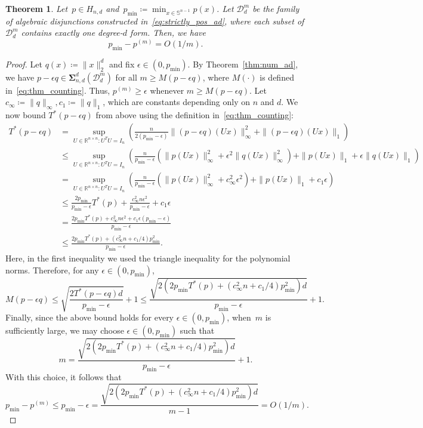 \documentclass[12pt]{article}
\newcommand{\reals}{\mathbb{R}}
\newcommand{\DiSOS}{\mathbf{\Sigma}}
\newcommand{\defeq}{\coloneq}
\newcommand{\mbS}{\mathbb{S}}
\newcommand{\mcD}{\mathcal{D}}
\newtheorem{theorem}{Theorem}%
\theoremstyle{remark}
\begin{document}
\begin{theorem}\label{thm:poly_min_disos_lb}
Let~$p\in H_{n,d}$ and~$p_{\min}\defeq\min_{x\in\mbS^{n-1}} p(x)$. Let $\mcD^m_d$ be the family of algebraic disjunctions constructed in~\eqref{eq:strictly_pos_ad}, where each subset of $\mcD_d^m$ contains exactly one degree-$d$ form. 
Then, we have
\[p_{\min}-p^{(m)}= O(1/m).\] 
\end{theorem}
\begin{proof}
Let $q(x)\defeq\|x\|_2^d$ and fix $\epsilon\in(0,p_{\min})$. By Theorem~\ref{thm:num_ad}, we have $p-\epsilon q\in\DiSOS_{n,d}^d(\mcD_d^m)$ for all $m\ge M(p-\epsilon q)$, where $M(\cdot)$ is defined in~\eqref{eq:thm_counting}. Thus, $ p^{(m)}\ge \epsilon$ 
whenever $m\ge M(p-\epsilon q)$. Let $c_{\infty}\defeq \|q\|_{\infty},c_1\defeq\|q\|_1$, which are constants depending only on $n$ and $d$. We now bound $T^*(p - \epsilon q)$ from above using the definition in~\eqref{eq:thm_counting}:
\[\begin{aligned}
T^*(p-\epsilon q)&= \sup_{U\in\reals^{n\times n}:U^TU=I_n}\left( \frac{n}{2(p_{\min}-\epsilon)}\|(p-\epsilon q)(Ux)\|_{\infty}^2 + \|(p-\epsilon q)(Ux)\|_1\right) \\
&\le \sup_{U\in\reals^{n\times n}:U^TU=I_n}\left( \frac{n}{p_{\min}-\epsilon}\left(\|p(Ux)\|_{\infty}^2+\epsilon^2\|q(Ux)\|_{\infty}^2\right) + \|p(Ux)\|_1+\epsilon \|q(Ux)\|_1\right)\\
&= \sup_{U\in\reals^{n\times n}:U^TU=I_n}\left( \frac{n}{p_{\min}-\epsilon}\left(\|p(Ux)\|_{\infty}^2+c_{\infty}^2\epsilon^2\right) + \|p(Ux)\|_1+c_1\epsilon\right)\\
&\le \frac{2p_{\min}}{p_{\min}-\epsilon} T^*(p)+\frac{c_{\infty}^2n\epsilon^2}{p_{\min}-\epsilon}+c_1\epsilon\\
&= \frac{2p_{\min}T^*(p)+c_{\infty}^2n\epsilon^2+c_1\epsilon(p_{\min}-\epsilon)}{p_{\min}-\epsilon}\\
&\le \frac{2p_{\min}T^*(p)+(c_{\infty}^2n+c_1/4)p_{\min}^2}{p_{\min}-\epsilon}.
\end{aligned}\]
Here, in the first inequality we used the triangle inequality for the polynomial norms. 
Therefore, for any $\epsilon\in(0,p_{\min})$, 
\[M(p-\epsilon q)\le \sqrt{\frac{2T^*(p-\epsilon q)d}{p_{\min}-\epsilon}}+1\le \frac{\sqrt{2(2p_{\min}T^*(p)+(c_{\infty}^2n+c_1/4)p_{\min}^2)d}}{p_{\min}-\epsilon}+1.\]
Finally, since the above bound holds for every $\epsilon\in(0,p_{\min})$, when~$m$ is sufficiently large, we may choose $\epsilon\in(0,p_{\min})$ such that
\[m = \frac{\sqrt{2(2p_{\min}T^*(p)+(c_{\infty}^2n+c_1/4)p_{\min}^2)d}}{p_{\min}-\epsilon}+1.\]
With this choice, it follows that
\[p_{\min}-p^{(m)}\le p_{\min}-\epsilon= \frac{\sqrt{2(2p_{\min}T^*(p)+(c_{\infty}^2n+c_1/4)p_{\min}^2)d}}{m-1}=O(1/m).\]
\end{proof}
\end{document}
